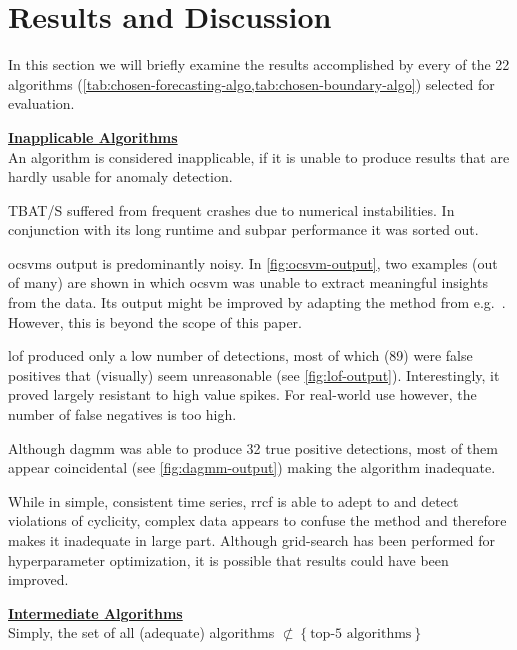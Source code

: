 \section{Results and Discussion}\label{sect:results-and-discussion}
In this section we will briefly examine the results accomplished by every
of the 22 algorithms (\cref{tab:chosen-forecasting-algo,tab:chosen-boundary-algo})
selected for evaluation.

\bigskip
{\large\uline{\textbf{Inapplicable Algorithms}}}\\
An algorithm is considered inapplicable, if it is unable to produce results that
are hardly usable for anomaly detection.
\begin{description}[style=unboxed,leftmargin=0cm]
    \item[TBAT/S] TBAT/S suffered from frequent crashes due to numerical instabilities.
    In conjunction with its long runtime and subpar performance it was sorted out.
    \item[OCSVM] \gls{ocsvm}s output is predominantly noisy. In \cref{fig:ocsvm-output},
    two examples (out of many) are shown in which \gls{ocsvm} was unable to extract
    meaningful insights from the data. Its output might be improved by adapting
    the method from e.g.\ \textcite{GomezVerdejo.2011}. However, this is beyond
    the scope of this paper.
    \item[LOF] \gls{lof} produced only a low number of detections, most of which
    (89) were false positives that (visually) seem unreasonable (see \cref{fig:lof-output}).
    Interestingly, it proved largely resistant to high value spikes.
    For real-world use however, the number of false negatives is too high.
    \item[DAGMM] Although \gls{dagmm} was able to produce 32 true positive detections,
    most of them appear coincidental (see \cref{fig:dagmm-output}) making the 
    algorithm inadequate.
    \item[RRCF] While in simple, consistent time series, \gls{rrcf} is able to
    adept to and detect violations of cyclicity, complex data appears to confuse
    the method and therefore makes it inadequate in large part. Although grid-search
    has been performed for hyperparameter optimization, it is possible that
    results could have been improved.
\end{description}
\bigskip
{\large\uline{\textbf{Intermediate Algorithms}}}\\
Simply, the set of all (adequate) algorithms \(\not\subset \left\{\text{top-5 algorithms}\right\}\)
